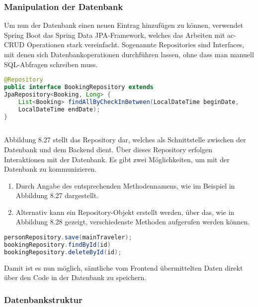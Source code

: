 	\newpage
	\subsubsection{Manipulation der Datenbank}
	\noindent Um nun der Datenbank einen neuen Eintrag hinzufügen zu können, verwendet Spring Boot das Spring Data JPA-Framework, welches das Arbeiten mit \gls{ac-CRUD} Operationen stark vereinfacht. Sogenannte Repositories sind Interfaces, mit denen sich Datenbankoperationen durchführen lassen, ohne dass man manuell SQL-Abfragen schreiben muss.
	
\begin{lstlisting}[language=Java, caption={Code-Ausschnitt: Repository.}]
@Repository
public interface BookingRepository extends
JpaRepository<Booking, Long> {
	List<Booking> findAllByCheckInBetween(LocalDateTime beginDate,
	LocalDateTime endDate);
}
			
\end{lstlisting}
	
	\noindent Abbildung 8.27 stellt das Repository dar, welches als Schnittstelle zwischen der Datenbank und dem Backend dient. Über dieses Repository erfolgen Interaktionen mit der Datenbank. Es gibt zwei Möglichkeiten, um mit der Datenbank zu kommunizieren. 
	
	\begin{enumerate}
		\item Durch Angabe des entsprechenden Methodennamens, wie im Beispiel in Abbildung 8.27 dargestellt.
		\item Alternativ kann ein Repository-Objekt erstellt werden, über das, wie in Abbildung 8.28 gezeigt, verschiedenste Methoden aufgerufen werden können.
	\end{enumerate}
	
	
\begin{lstlisting}[language=Java, caption={Code-Ausschnitt: Methoden-Aufrufe}]
personRepository.save(mainTraveler);
bookingRepository.findById(id)
bookingRepository.deleteById(id);
\end{lstlisting}
	
	\vspace{3mm}
	\noindent Damit ist es nun möglich, sämtliche vom Frontend übermittelten Daten direkt über den Code in der Datenbank zu speichern.
	
	\subsubsection{Datenbankstruktur}
	
